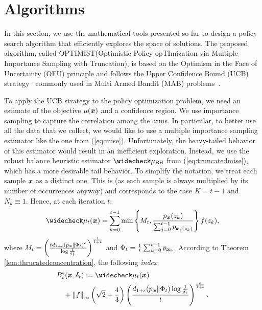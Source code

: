 \documentclass{article}
\makeatletter
\DeclareRobustCommand{\algoname}{OPTIMIST\@\xspace}
\makeatother
\begin{document}
\section{Algorithms}\label{sec:algo}
In this section, we use the mathematical tools presented so far to design a policy search algorithm that efficiently explores the space of solutions. The proposed algorithm, called \algoname (Optimistic Policy opTImization via Multiple Importance Sampling with Truncation), is based on the Optimism in the Face of Uncertainty (OFU) principle and follows the Upper Confidence Bound (UCB) strategy~\citep{lai1985asymptotically,agrawal1995sample,auer2002finite} commonly used in Multi Armed Bandit (MAB) problems~\citep{robbins1985some,bubeck2012regret,lattimore2019bandit}. 

To apply the UCB strategy to the policy optimization problem, we need an estimate of the objective $\mu(\boldsymbol{x})$ and a confidence region. We use importance sampling to capture the correlation among the arms. In particular, to better use all the data that we collect, we would like to use a multiple importance sampling estimator like the one from (\ref{eq:mise}). Unfortunately, the heavy-tailed behavior of this estimator would result in an inefficient exploration.
Instead, we use the robust balance heuristic estimator $\wc{\mu}_{\text{BH}}$ from (\ref{eq:truncatedmise}), which has a more desirable tail behavior. To simplify the notation, we treat each sample $\boldsymbol{x}$ as a distinct one. This is \wlg (as each sample is always multiplied by its number of occurrences anyway) and corresponds to the case $K=t-1$ and $N_k\equiv1$. Hence, at each iteration $t$:
\begin{align}\label{eq:wcmu}
	\wc{\mu}_t(\vx) = \sum_{k=0}^{t-1}
	\min\left\{M_{t}, \frac{p_{\vx}(z_k)}
	{\sum_{j=0}^{t-1}p_{\vx_j(z_k)}}\right\}f(z_k),
\end{align}
where ${M_{t} = \left(\frac{td_{1+\epsilon}(p_{\boldsymbol{x}}\|\Phi_t)^{\epsilon}}{\log\frac{1}{\delta_t}}\right)^{\frac{1}{1+\epsilon}}}$ and ${\Phi_t = \frac{1}{t}\sum_{k=0}^{t-1}p_{\boldsymbol{x}_k}}$.
According to Theorem \ref{lem:thrucatedconcentration}, the following \textit{index}:
\begin{align*}
	&B_t^{\epsilon}(\vx,\delta_t) \coloneqq 
	\wc{\mu}_t(\vx) \nonumber\\
	&\quad+\norm[\infty]{f}\left(\sqrt{2}+\frac{4}{3}\right)
	\left(\frac{d_{1+\epsilon}(p_{\vx}\|\Phi_{t})\log\frac{1}{\delta_t}}{t}\right)^{\frac{\epsilon}{1+\epsilon}},
\end{align*}
\end{document}
